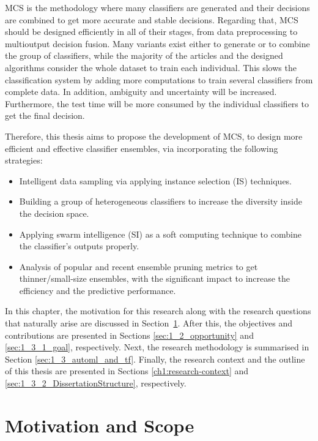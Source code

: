 MCS is the methodology where many classifiers are generated and their decisions are combined to get more accurate and stable decisions. Regarding that, MCS should be designed efficiently in all of their stages, from data preprocessing to multioutput decision fusion. Many variants exist either to generate or to combine the group of classifiers, while the majority of the articles and the designed algorithms consider the whole dataset to train each individual. This slows the classification system by adding more computations to train several classifiers from complete data. In addition, ambiguity and uncertainty will be increased. Furthermore, the test time will be more consumed by the individual classifiers to get the final decision.     

Therefore, this thesis aims to propose the development of MCS, to design more efficient and effective classifier ensembles, via incorporating the following strategies:
\begin{itemize} [nosep]
    \item Intelligent data sampling via applying instance selection (IS) techniques.
    \item Building a group of heterogeneous classifiers to increase the diversity inside the decision space.
    \item Applying swarm intelligence (SI) as a soft computing technique to combine the classifier's outputs properly.
    \item Analysis of popular and recent ensemble pruning metrics to get thinner/small-size ensembles, with the significant impact to increase the efficiency and the predictive performance.
\end{itemize}

     

In this chapter, the motivation for this research along with the research questions
that naturally arise are discussed in  Section~\ref{sec:1_1_motivation}. After this, the objectives and contributions are presented in Sections \ref{sec:1_2_opportunity} and \ref{sec:1_3_1_goal}, respectively. Next, the
research methodology is summarised in Section \ref{sec:1_3_automl_and_tf}. Finally,
the research context and the outline of this thesis are presented in Sections \ref{ch1:research-context} and
\ref{sec:1_3_2_DissertationStructure}, respectively.





\section{Motivation and Scope}
\label{sec:1_1_motivation}

